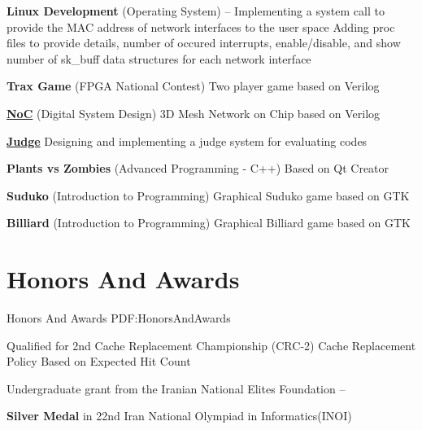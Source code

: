 \documentclass[a4paper,9pt,oneside]{article}
\begin{document}
\begin{body}
\BulletItem
\textbf{Linux Development} (Operating System)
\hfill
{} -- 
\SubBulletItem
Implementing a system call to provide the MAC address of network interfaces to the user space
\SubBulletItem
Adding proc files to provide details, number of occured interrupts, enable/disable, and show number of sk\_buff data structures for each network interface

\BulletItem
\textbf{Trax Game} (FPGA National Contest)
\hfill
{}
\SubBulletItem
Two player game based on Verilog

\BulletItem
\href{https://github.com/arminvakil/NoC}
{\textbf{NoC}} (Digital System Design)
\hfill
{}
\SubBulletItem
3D Mesh Network on Chip based on Verilog

\BulletItem
\href{https://github.com/Rmin1995/Judge}
{\textbf{Judge}}
\hfill
{}
\SubBulletItem
Designing and implementing a judge system for evaluating codes

\BulletItem
\textbf{Plants vs Zombies} (Advanced Programming - C++)
\hfill
{}
\SubBulletItem
Based on Qt Creator

\BulletItem
\textbf{Suduko} (Introduction to Programming)
\hfill
{}
\SubBulletItem
Graphical Suduko game based on GTK

\BulletItem
\textbf{Billiard} (Introduction to Programming)
\hfill
{}
\SubBulletItem
Graphical Billiard game based on GTK




\section
{Honors\newline
And\newline
Awards}
{Honors\newline
And\newline
Awards}
{PDF:HonorsAndAwards}

\BulletItem
Qualified for 2nd Cache Replacement Championship (CRC-2)
\SubBulletItem
Cache Replacement Policy Based on Expected Hit Count
\hfill
{}

\BulletItem
Undergraduate grant from the Iranian National Elites Foundation
\hfill
{} -- 

\BulletItem
\textbf{Silver Medal} in 22nd Iran National Olympiad in Informatics(INOI)
\hfill
{}




\end{body}
\end{document}
